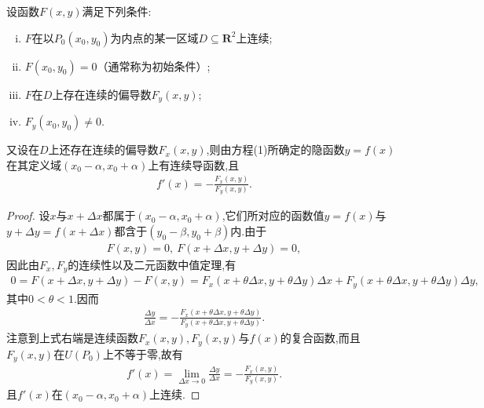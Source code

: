 \documentclass[../../main.tex]{subfiles}%
\begin{document}
\begin{theorem}[隐函数可微性定理]\label{theorem:隐函数可微性定理}
设函数$F(x,y)$满足下列条件:
\begin{enumerate}[(i)]
\item $F$在以$P_0(x_0,y_0)$为内点的某一区域$D \subseteq \mathbf{R}^2$上连续;
\item $F(x_0,y_0) = 0$（通常称为初始条件）;
\item $F$在$D$上存在连续的偏导数$F_y(x,y)$;
\item $F_y(x_0,y_0) \neq 0$.
\end{enumerate}
又设在$D$上还存在连续的偏导数$F_x(x,y)$,则由方程(1)所确定的隐函数$y=f(x)$在其定义域$(x_0-\alpha,x_0+\alpha)$上有连续导函数,且
\begin{align*}
f'(x) = -\frac{F_x(x,y)}{F_y(x,y)}. 
\end{align*}
\end{theorem}
\begin{proof}

设$x$与$x+\Delta x$都属于$(x_0-\alpha,x_0+\alpha)$,它们所对应的函数值$y=f(x)$与$y+\Delta y=f(x+\Delta x)$都含于$(y_0-\beta,y_0+\beta)$内.由于
\begin{align*}
F(x,y) = 0,\ F(x+\Delta x,y+\Delta y) = 0,
\end{align*}
因此由$F_x,F_y$的连续性以及二元函数中值定理,有
\begin{align*}
0 = F(x+\Delta x,y+\Delta y) - F(x,y) = F_x(x+\theta\Delta x,y+\theta\Delta y)\Delta x + F_y(x+\theta\Delta x,y+\theta\Delta y)\Delta y,
\end{align*}
其中$0 < \theta < 1$.因而
\begin{align*}
\frac{\Delta y}{\Delta x} = -\frac{F_x(x+\theta\Delta x,y+\theta\Delta y)}{F_y(x+\theta\Delta x,y+\theta\Delta y)}.
\end{align*}
注意到上式右端是连续函数$F_x(x,y),F_y(x,y)$与$f(x)$的复合函数,而且$F_y(x,y)$在$U(P_0)$上不等于零,故有
\begin{align*}
f'(x) = \lim_{\Delta x \to 0} \frac{\Delta y}{\Delta x} = -\frac{F_x(x,y)}{F_y(x,y)}.
\end{align*}
且$f'(x)$在$(x_0-\alpha,x_0+\alpha)$上连续.


\end{proof}
\end{document}
